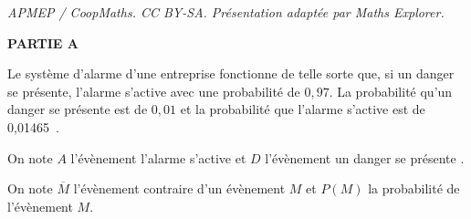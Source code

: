 \documentclass[10pt]{article}
\providecommand{\np}[2][]{{#2~#1}}
\begin{document}
\noindent\textit{APMEP / CoopMaths. CC BY-SA. Présentation adaptée par Maths Explorer.}\par\medskip
\medskip

\textbf{PARTIE A}

\medskip

Le système d'alarme d'une entreprise fonctionne de telle sorte que, si un danger se présente, l'alarme s'active avec une probabilité de $0,97$. 
La probabilité qu'un danger se présente est de $0,01$ et la probabilité que l'alarme s'active est de \np{0,01465}.

On note $A$ l'évènement \og  l'alarme s'active \fg{}  et $D$ l'évènement \og  un danger se présente \fg . 

On note $\overline{M}$ l'évènement contraire d'un évènement $M$ et $P(M)$ la probabilité de l'évènement $M$.
\end{document}
